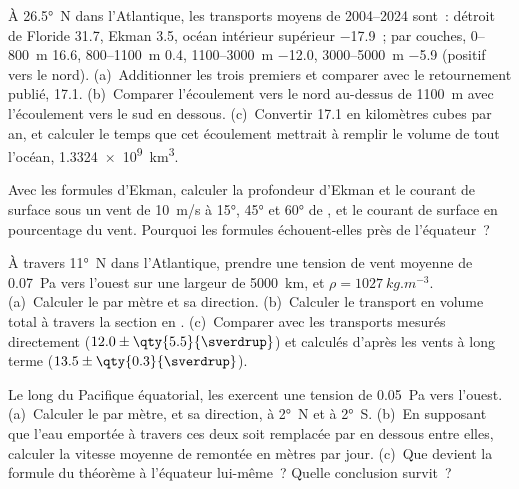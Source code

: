 \begin{exercise}[$\star$]\label{exo:b1:ocean-circulation:3}
À \ang{26.5}~N dans l'Atlantique, les transports moyens de 2004--2024 sont~: détroit de
Floride \qty{31.7}{\sverdrup}, Ekman \qty{3.5}{\sverdrup}, océan intérieur supérieur
\qty{-17.9}{\sverdrup}~; par couches, 0--\qty{800}{m} \qty{16.6}{\sverdrup},
800--\qty{1100}{m} \qty{0.4}{\sverdrup}, 1100--\qty{3000}{m} \qty{-12.0}{\sverdrup},
3000--\qty{5000}{m} \qty{-5.9}{\sverdrup} (positif vers le nord). (a)~Additionner les trois
premiers et comparer avec le retournement publié, \qty{17.1}{\sverdrup}. (b)~Comparer
l'écoulement vers le nord au-dessus de \qty{1100}{m} avec l'écoulement vers le sud en dessous. (c)~Convertir
\qty{17.1}{\sverdrup} en kilomètres cubes par an, et calculer le temps que cet écoulement
mettrait à remplir le volume de tout l'océan, \qty{1.3324e9}{km^3}.
\end{exercise}

\begin{exercise}[$\star$]\label{exo:b1:ocean-circulation:4}
Avec les formules d'Ekman, calculer la profondeur d'Ekman et le courant de surface sous un vent
de \qty{10}{m/s} à \ang{15}, \ang{45} et \ang{60} de , et le courant de surface
en pourcentage du vent. Pourquoi les formules échouent-elles près de l'équateur~?
\end{exercise}

\begin{exercise}[$\star\star$]\label{exo:b1:ocean-circulation:5}
À travers \ang{11}~N dans l'Atlantique, prendre une tension de vent moyenne de \qty{0.07}{Pa} vers
l'ouest sur une largeur de \qty{5000}{km}, et $\rho = \qty{1027}{kg.m^{-3}}$.
(a)~Calculer le  par mètre et sa direction. (b)~Calculer le
transport en volume total à travers la section en . (c)~Comparer avec les transports
mesurés directement ($12.0 \pm \qty{5.5}{\sverdrup}$) et calculés d'après les vents
à long terme ($13.5 \pm \qty{0.3}{\sverdrup}$).
\end{exercise}

\begin{exercise}[$\star\star$]\label{exo:b1:ocean-circulation:6}
Le long du Pacifique équatorial, les  exercent une tension de \qty{0.05}{Pa}
vers l'ouest. (a)~Calculer le  par mètre, et sa direction, à
\ang{2}~N et à \ang{2}~S. (b)~En supposant que l'eau emportée à travers ces deux
 soit remplacée par en dessous entre elles, calculer la vitesse moyenne de remontée
en mètres par jour. (c)~Que devient la formule du théorème à l'équateur
lui-même~? Quelle conclusion survit~?
\end{exercise}

